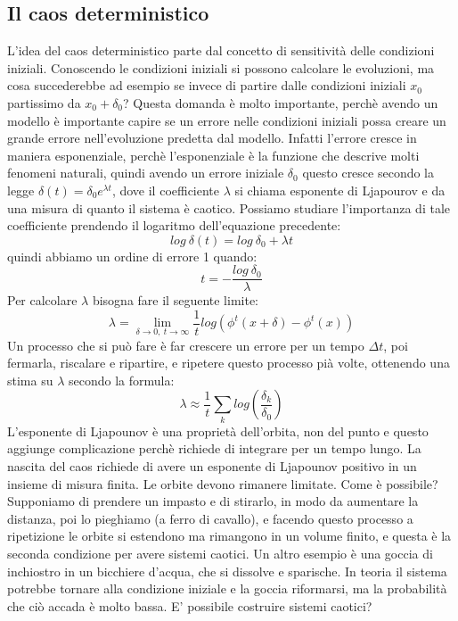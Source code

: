 \documentclass[12pt]{article}
\begin{document}
\subsection{Il caos deterministico}
L'idea del caos deterministico parte dal concetto di sensitività delle condizioni iniziali.  Conoscendo le condizioni iniziali si possono calcolare le evoluzioni, ma cosa succederebbe ad esempio se invece di partire dalle condizioni iniziali $x_0$ partissimo da $x_0 + \delta_0$? Questa domanda è molto importante, perchè avendo un modello è importante capire se un errore nelle condizioni iniziali possa creare un grande errore nell'evoluzione predetta dal modello. Infatti l'errore cresce in maniera esponenziale, perchè l'esponenziale è la funzione che descrive molti fenomeni naturali, quindi avendo un errore iniziale $\delta_0$ questo cresce secondo la legge $\delta (t) = \delta_0 e^{\lambda t}$, dove il coefficiente $\lambda$ si chiama esponente di Ljapourov e da una misura di quanto il sistema è caotico. Possiamo studiare l'importanza di tale coefficiente prendendo il logaritmo dell'equazione precedente:
$$
log \ \delta (t) = log \ \delta_0 + \lambda t
$$
quindi abbiamo un ordine di errore 1 quando: 
\begin{equation}
	t = -\frac{log \ \delta_0}{\lambda}
\end{equation}
Per calcolare $\lambda$ bisogna fare il seguente limite: 
\begin{equation}
	\lambda = \lim_{\delta \rightarrow 0, \ t \rightarrow \infty} \frac{1}{t} log (\phi^t(x+\delta) - \phi^t(x))
\end{equation}
Un processo che si può fare è far crescere un errore per un tempo $\Delta t$, poi fermarla, riscalare e ripartire, e ripetere questo processo pià volte, ottenendo una stima su $\lambda$ secondo la formula: 
\begin{equation}
	\lambda \approx \frac{1}{t} \sum_k log \left(\frac{\delta_k}{\delta_0} \right)
\end{equation}
L'esponente di Ljapounov è una proprietà dell'orbita, non del punto e questo aggiunge complicazione perchè richiede di integrare per un tempo lungo. La nascita del caos richiede di avere un esponente di Ljapounov positivo in un insieme di misura finita. Le orbite devono rimanere limitate. Come è possibile? Supponiamo di prendere un impasto e di stirarlo, in modo da aumentare la distanza, poi lo pieghiamo (a ferro di cavallo), e facendo questo processo a ripetizione le orbite si estendono ma rimangono in un volume finito, e questa è la seconda condizione per avere sistemi caotici. Un altro esempio è una goccia di inchiostro in un bicchiere d'acqua, che si dissolve e sparische. In teoria il sistema potrebbe tornare alla condizione iniziale e la goccia riformarsi, ma la probabilità che ciò accada è molto bassa. E' possibile costruire sistemi caotici? 
\end{document}
